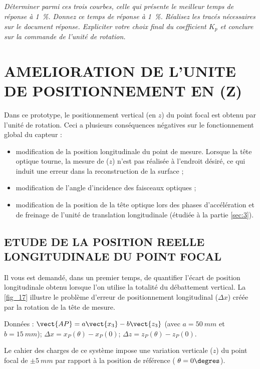 \subparagraph{\label{q_14}}\textit{Déterminer parmi ces trois courbes, celle qui présente le meilleur temps de réponse à \SI{1}{\%}. Donnez ce temps de réponse à \SI{1}{\%}. Réalisez les tracés nécessaires sur le document réponse.
Expliciter votre choix final du coefficient $K_p$ et conclure sur la commande de l’unité de rotation.}


\section{AMELIORATION DE L’UNITE DE POSITIONNEMENT EN (Z)}

Dans ce prototype, le positionnement vertical (en $z$) du point focal est obtenu par l’unité de rotation. Ceci a
plusieurs conséquences négatives sur le fonctionnement global du capteur :
\begin{itemize}
\item modification de la position longitudinale du point de mesure. Lorsque la tête optique tourne, la
mesure de ($z$) n’est pas réalisée à l’endroit désiré, ce qui induit une erreur dans la reconstruction de
la surface ;
\item modification de l’angle d’incidence des faisceaux optiques ;
\item modification de la position de la tête optique lors des phases d’accélération et de freinage de l’unité
de translation longitudinale (étudiée à la partie \ref{sec:3}).
\end{itemize}


\subsection{ETUDE DE LA POSITION REELLE LONGITUDINALE DU POINT FOCAL}

Il vous est demandé, dans un premier temps, de quantifier l’écart de position
longitudinale obtenu lorsque l’on utilise la totalité du débattement vertical.
La \autoref{fig_17} illustre le problème d’erreur de positionnement longitudinal ($\Delta x$) créée
par la rotation de la tête de mesure. 

Données : 
$ \vect{AP} = a\vect{x_3}-b\vect{z_3}$ (avec $a = \SI{50}{mm}$ et $b =\SI{15}{mm}$);
$\Delta x = x_P(\theta)-x_P(0)$; $\Delta z = z_P(\theta) - z_P(0)$.

Le cahier des charges de ce système impose une variation verticale ($z$) du point
focal de $\pm \SI{5}{mm}$ par rapport à la position de référence ( $\theta = 0\degres$).
